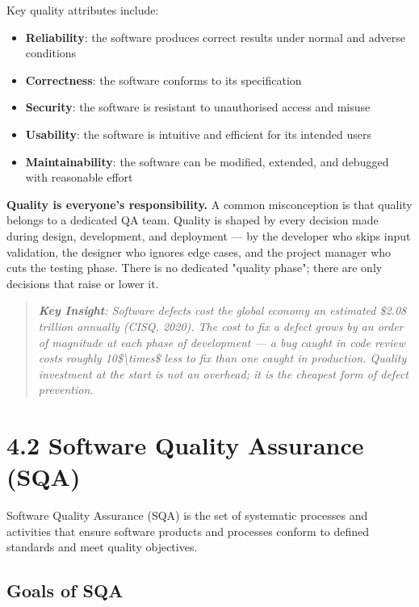 \documentclass[11pt,a4paper]{book}
\begin{document}
Key quality attributes include:

\begin{itemize}
  \item \textbf{Reliability}: the software produces correct results under normal and adverse conditions
  \item \textbf{Correctness}: the software conforms to its specification
  \item \textbf{Security}: the software is resistant to unauthorised access and misuse
  \item \textbf{Usability}: the software is intuitive and efficient for its intended users
  \item \textbf{Maintainability}: the software can be modified, extended, and debugged with reasonable effort
\end{itemize}

\textbf{Quality is everyone's responsibility.} A common misconception is that quality belongs to a dedicated QA team. Quality is shaped by every decision made during design, development, and deployment --- by the developer who skips input validation, the designer who ignores edge cases, and the project manager who cuts the testing phase. There is no dedicated "quality phase"; there are only decisions that raise or lower it.

\begin{quote}
\textit{\textbf{Key Insight}: Software defects cost the global economy an estimated \$2.08 trillion annually (CISQ, 2020). The cost to fix a defect grows by an order of magnitude at each phase of development --- a bug caught in code review costs roughly 10\$\textbackslash{}times\$ less to fix than one caught in production. Quality investment at the start is not an overhead; it is the cheapest form of defect prevention.}
\end{quote}

\medskip

\section{4.2 Software Quality Assurance (SQA)}

Software Quality Assurance (SQA) is the set of systematic processes and activities that ensure software products and processes conform to defined standards and meet quality objectives.

\subsection{Goals of SQA}
\end{document}
